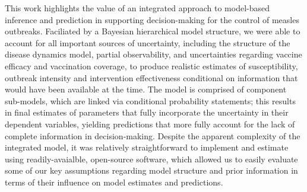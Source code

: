 This work highlights the value of an integrated approach to model-based inference and prediction in supporting decision-making for the control of measles outbreaks. Faciliated by a Bayesian hierarchical model structure, we were able to account for all important sources of uncertainty, including the structure of the disease dynamics model, partial observability, and uncertainties regarding vaccine efficacy and vaccination coverage, to produce realistic estimates of susceptibility, outbreak intensity and intervention effectiveness conditional on information that would have been available at the time. The model is comprised of component sub-models, which are linked via conditional probability statements; this results in final estimates of parameters that fully incorporate the uncertainty in their dependent variables, yielding predictions that more fully account for the lack of complete information in decision-making. Despite the apparent complexity of the integrated model, it was relatively straightforward to implement and estimate using readily-avaialble, open-source software, which allowed us to easily evaluate some of our key assumptions regarding model structure and prior information in terms of their influence on model estimates and predictions. 

